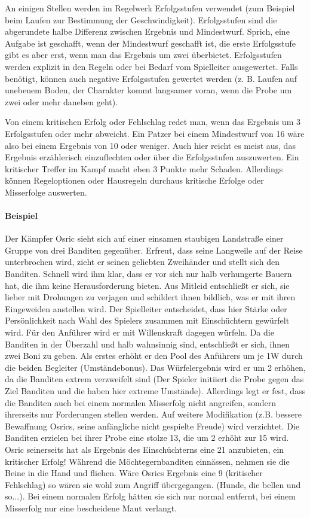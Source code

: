\documentclass{article}
\begin{document}
An einigen Stellen werden im Regelwerk Erfolgsstufen verwendet (zum Beispiel beim Laufen zur Bestimmung der
Geschwindigkeit). Erfolgsstufen sind die abgerundete halbe Differenz zwischen Ergebnis und Mindestwurf. Sprich, eine
Aufgabe ist geschafft, wenn der Mindestwurf geschafft ist, die erste Erfolgsstufe gibt es aber erst, wenn man das
Ergebnis um zwei überbietet. Erfolgsstufen werden explizit in den Regeln oder bei Bedarf vom Spielleiter ausgewertet.
Falls benötigt, können auch negative Erfolgsstufen gewertet werden (z. B. Laufen auf unebenem Boden, der Charakter
kommt langsamer voran, wenn die Probe um zwei oder mehr daneben geht).

Von einem kritischen Erfolg oder Fehlschlag redet man, wenn das Ergebnis um 3 Erfolgsstufen oder mehr abweicht. Ein
Patzer bei einem Mindestwurf von 16 wäre also bei einem Ergebnis von 10 oder weniger. Auch hier reicht es meist aus,
das Ergebnis erzählerisch einzuflechten oder über die Erfolgsstufen auszuwerten. Ein kritischer Treffer im Kampf macht
eben 3 Punkte mehr Schaden. Allerdings können Regeloptionen oder Hausregeln durchaus kritische Erfolge oder
Misserfolge auswerten.

\paragraph{Beispiel}

Der Kämpfer Osric sieht sich auf einer einsamen staubigen Landstraße einer Gruppe von drei Banditen gegenüber.
Erfreut, dass seine Langweile auf der Reise unterbrochen wird, zieht er seinen geliebten Zweihänder und stellt sich den
Banditen. Schnell wird ihm klar, dass er vor sich nur halb verhungerte Bauern hat, die ihm keine Herausforderung bieten.
Aus Mitleid entschließt er sich, sie lieber mit Drohungen zu verjagen und schildert ihnen bildlich, was er mit ihren
Eingeweiden anstellen wird. Der Spielleiter entscheidet, dass hier Stärke oder Persönlichkeit nach Wahl des Spielers
zusammen mit Einschüchtern gewürfelt wird. Für den Anführer wird er mit Willenskraft dagegen würfeln. Da die Banditen
in der Überzahl und halb wahnsinnig sind, entschließt er sich, ihnen zwei Boni zu geben. Als erstes erhöht er den Pool des
Anführers um je 1W durch die beiden Begleiter (Umständebonus). Das Würfelergebnis wird er um 2 erhöhen, da die Banditen
extrem verzweifelt sind (Der Spieler initiiert die Probe gegen das Ziel Banditen und die haben hier extreme Umstände).
Allerdings legt er fest, dass die Banditen auch bei einem normalen Misserfolg nicht angreifen, sondern ihrerseits nur
Forderungen stellen werden. Auf weitere Modifikation (z.B. bessere Bewaffnung Osrics, seine anfängliche nicht gespielte
Freude) wird verzichtet. Die Banditen erzielen bei ihrer Probe eine stolze 13, die um 2 erhöht zur 15 wird. Osric
seinerseits hat als Ergebnis des Einschüchterns eine 21 anzubieten, ein kritischer Erfolg! Während die Möchtegernbanditen
einnässen, nehmen sie die Beine in die Hand und fliehen. Wäre Osrics Ergebnis eine 9 (kritischer Fehlschlag) so wären sie
wohl zum Angriff übergegangen. (Hunde, die bellen und so...). Bei einem normalen Erfolg hätten sie sich nur normal
entfernt, bei einem Misserfolg nur eine bescheidene Maut verlangt.
\end{document}
